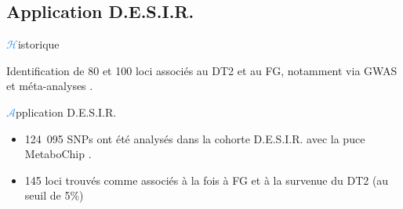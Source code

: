\subsection{Application D.E.S.I.R.}
\begin{frame}{{\huge\textcolor{dodgerblue}{$\mathcal{H}$}}istorique}{}
\par{Identification de 80 et 100 loci associés au DT2 et au FG, notamment via GWAS et méta-analyses \textcolor{dodgerblue}{\citep{dupuis_new_2010, yaghootkar_recent_2013, vaxillaire_type_2014}}.}
\begin{center}
\end{center}
\end{frame}

\begin{frame}{{\huge\textcolor{dodgerblue}{$\mathcal{A}$}}pplication D.E.S.I.R.}{}
\begin{center}
\end{center}
\vspace{-1em}
{\footnotesize
\begin{minipage}[t]{0.475\columnwidth}
\par{\begin{itemize}
\item 124~095 SNPs ont été analysés dans la cohorte \textcolor{springgreen3}{D.E.S.I.R.} avec la puce MetaboChip \textcolor{dodgerblue}{\citep{voight_metabochip_2012}}.
\end{itemize}}
\end{minipage}%
\hfill\vline\hfill
\begin{minipage}[t]{0.475\columnwidth}%
\par{\begin{itemize}
\item \textcolor{springgreen3}{145} loci trouvés comme associés à la fois à \textcolor{springgreen3}{FG} et à la survenue du \textcolor{springgreen3}{DT2} (au seuil de \textcolor{springgreen3}{5\%})
\end{itemize}}
\end{minipage}
}
\end{frame}

